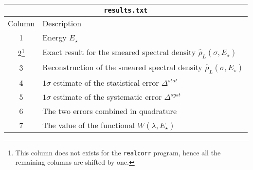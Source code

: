 \documentclass[12pt]{article}
\begin{document}
\begin{center}
\begin{tabular}{c|l}
\multicolumn{2}{c}{\texttt{results.txt}} \\
\hline
Column & Description\hspace{9cm} \\
\hline
1 & Energy $E_\star$ \\
2\footnote{This column does not exists for the \texttt{realcorr} program, hence all the remaining columns are shifted by one.} & Exact result for the smeared spectral density $\hat\rho_L(\sigma,E_\star)$ \\
3 & Reconstruction of the smeared spectral density $\hat\rho_L(\sigma,E_\star)$ \\
4 & $1\sigma$ estimate of the statistical error $\Delta^{stat}$ \\
5 & $1\sigma$ estimate of the systematic error $\Delta^{syst}$ \\
6 & The two errors combined in quadrature \\
7 & The value of the functional $W(\lambda,E_\star)$
\end{tabular}
\end{center}

\pagestyle{empty}
\end{document}

